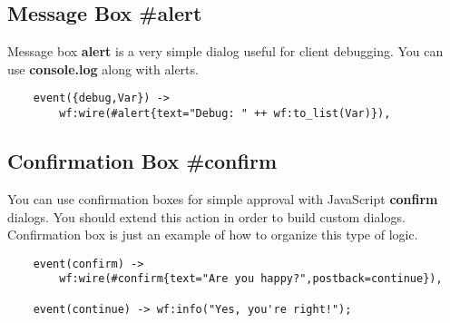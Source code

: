 \subsection{Message Box \#alert}
Message box {\bf alert} is a very simple dialog useful for client debugging.
You can use {\bf console.log} along with alerts.

\vspace{1\baselineskip}
\begin{lstlisting}
    event({debug,Var}) ->
        wf:wire(#alert{text="Debug: " ++ wf:to_list(Var)}),
\end{lstlisting}

\subsection{Confirmation Box \#confirm}
You can use confirmation boxes for simple approval with JavaScript {\bf confirm} dialogs.
You should extend this action in order to build custom dialogs. Confirmation box is just an example of how to
organize this type of logic.

\vspace{1\baselineskip}
\begin{lstlisting}
    event(confirm) ->
        wf:wire(#confirm{text="Are you happy?",postback=continue}),

    event(continue) -> wf:info("Yes, you're right!");
\end{lstlisting}
\vspace{1\baselineskip}

